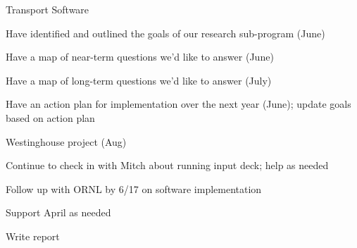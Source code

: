 \documentclass[12pt,twoside]{article}
\begin{document}
\begin{compactitem}
\item Transport Software
  \begin{compactitem}
  \item Have identified and outlined the goals of our research sub-program (June)
  \item Have a map of near-term questions we'd like to answer (June)
  \item Have a map of long-term questions we'd like to answer (July)
  \item Have an action plan for implementation over the next year (June); update goals based on action plan
  \end{compactitem}
\item Westinghouse project (Aug)
  \begin{compactitem}
  \item Continue to check in with Mitch about running input deck; help as needed
  \item Follow up with ORNL by 6/17 on software implementation
  \item Support April as needed
  \item Write report
  \end{compactitem}
\end{compactitem}
\end{document}

